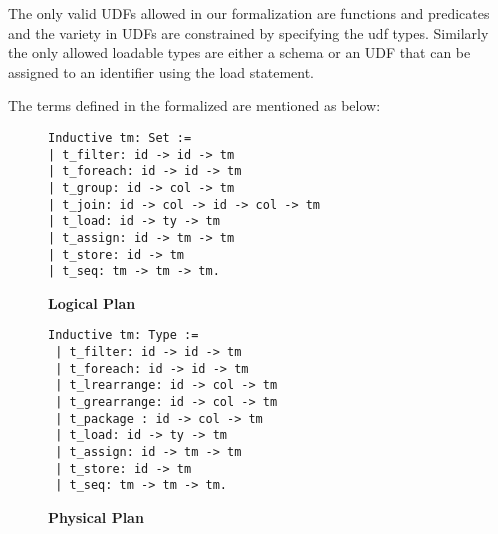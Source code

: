 The only valid UDFs allowed in our formalization are functions and predicates and the variety in UDFs are constrained by specifying the udf types. Similarly the only allowed loadable types are either a schema or an UDF that can be assigned to an identifier using the load statement.


The terms defined in the formalized are mentioned as below:

\begin{figure}
\centering
\begin{lstlisting}
Inductive tm: Set :=
| t_filter: id -> id -> tm
| t_foreach: id -> id -> tm 
| t_group: id -> col -> tm
| t_join: id -> col -> id -> col -> tm
| t_load: id -> ty -> tm
| t_assign: id -> tm -> tm
| t_store: id -> tm
| t_seq: tm -> tm -> tm.
\end{lstlisting}
\caption{\textbf{Logical Plan}}

\begin{lstlisting}
Inductive tm: Type :=
 | t_filter: id -> id -> tm
 | t_foreach: id -> id -> tm 
 | t_lrearrange: id -> col -> tm
 | t_grearrange: id -> col -> tm
 | t_package : id -> col -> tm
 | t_load: id -> ty -> tm
 | t_assign: id -> tm -> tm
 | t_store: id -> tm
 | t_seq: tm -> tm -> tm.
\end{lstlisting}
\caption{\textbf{Physical Plan}}
\end{figure}

